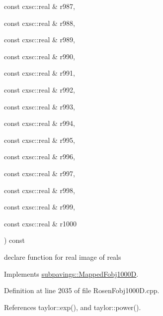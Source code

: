 {{\begin{DoxyParamCaption}
\item[{const cxsc\-::real \&}]{r987, }
\item[{const cxsc\-::real \&}]{r988, }
\item[{const cxsc\-::real \&}]{r989, }
\item[{const cxsc\-::real \&}]{r990, }
\item[{const cxsc\-::real \&}]{r991, }
\item[{const cxsc\-::real \&}]{r992, }
\item[{const cxsc\-::real \&}]{r993, }
\item[{const cxsc\-::real \&}]{r994, }
\item[{const cxsc\-::real \&}]{r995, }
\item[{const cxsc\-::real \&}]{r996, }
\item[{const cxsc\-::real \&}]{r997, }
\item[{const cxsc\-::real \&}]{r998, }
\item[{const cxsc\-::real \&}]{r999, }
\item[{const cxsc\-::real \&}]{r1000}
\end{DoxyParamCaption}
) const}}\label{classRosenFobj1000D_a7c7b469000d7db79db8b30e6a33dec1a}


declare function for real image of reals 



\-Implements \hyperlink{classsubpavings_1_1MappedFobj1000D_a3f1bac6f34725fcfb6c231bee7bede58}{subpavings\-::\-Mapped\-Fobj1000\-D}.



\-Definition at line 2035 of file \-Rosen\-Fobj1000\-D.\-cpp.



\-References taylor\-::exp(), and taylor\-::power().


